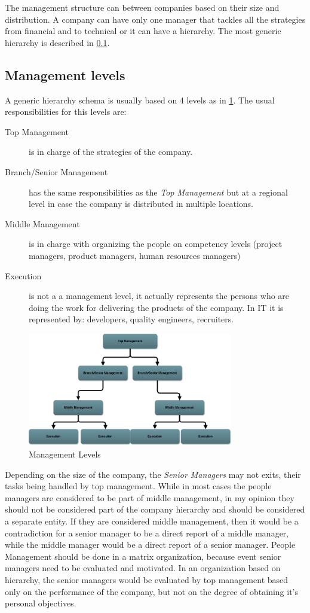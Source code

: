 The management structure can between companies based on their size and distribution. A company can have only one manager that tackles all the strategies from financial and to technical or it can have a hierarchy. 
The most generic hierarchy is described in \cref{subsec:levels}.
\subsection{Management levels}
\label{subsec:levels}
A generic hierarchy schema is usually based on 4 levels as in \cref{fig:levels}. The usual responsibilities for this levels are:

\begin{description}
\item[Top Management] is in charge of the strategies of the company.
\item[Branch/Senior Management] has the same responsibilities as the \textit{Top Management} but at a regional level in case the company is distributed in multiple locations.
\item[Middle Management] is in charge with organizing the people on competency levels (project managers, product managers, human resources managers)
\item[Execution] is not a a management level, it actually represents the persons who are doing the work for delivering the products of the company. In IT it is represented by: developers, quality engineers, recruiters.
\end{description} 

\begin{figure}[h]
\centering
\includegraphics[width=0.8\textwidth]{img/levels.png}
\caption{Management Levels}
\label{fig:levels}
\end{figure}
Depending on the size of the company, the \textit{Senior Managers} may not exits, their tasks being handled by top management.
While in most cases the people managers are considered to be part of middle management, in my opinion they should not be considered part of the company hierarchy and should be considered a separate entity. If they are considered middle management, then it would be a contradiction for a senior manager to be a direct report of a middle manager, while the middle manager would be a direct report of a senior manager. People Management should be done in a matrix organization, because event senior managers need to be evaluated and motivated. In an organization based on hierarchy, the senior managers would be evaluated by top management based only on the performance of the company, but not on the degree of obtaining it's personal objectives.


